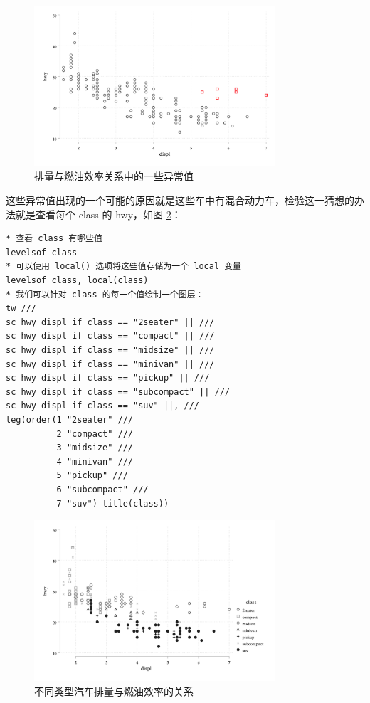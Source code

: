 \documentclass[]{ctexbook}
\begin{document}
\begin{figure}

{\centering \includegraphics[width=0.8\textwidth]{assets/hwydispl2} 

}

\caption{排量与燃油效率关系中的一些异常值}\label{fig:hwydispl2}
\end{figure}

这些异常值出现的一个可能的原因就是这些车中有混合动力车，检验这一猜想的办法就是查看每个 class 的 hwy，如图 \ref{fig:hwydispl3}：

\begin{lstlisting}
* 查看 class 有哪些值
levelsof class
* 可以使用 local() 选项将这些值存储为一个 local 变量
levelsof class, local(class)
* 我们可以针对 class 的每一个值绘制一个图层：
tw ///
sc hwy displ if class == "2seater" || ///
sc hwy displ if class == "compact" || ///
sc hwy displ if class == "midsize" || ///
sc hwy displ if class == "minivan" || ///
sc hwy displ if class == "pickup" || ///
sc hwy displ if class == "subcompact" || ///
sc hwy displ if class == "suv" ||, ///
leg(order(1 "2seater" ///
          2 "compact" ///
          3 "midsize" ///
          4 "minivan" ///
          5 "pickup" ///
          6 "subcompact" ///
          7 "suv") title(class))
\end{lstlisting}

\begin{figure}

{\centering \includegraphics[width=0.8\textwidth]{assets/hwydispl3} 

}

\caption{不同类型汽车排量与燃油效率的关系}\label{fig:hwydispl3}
\end{figure}
\end{document}
